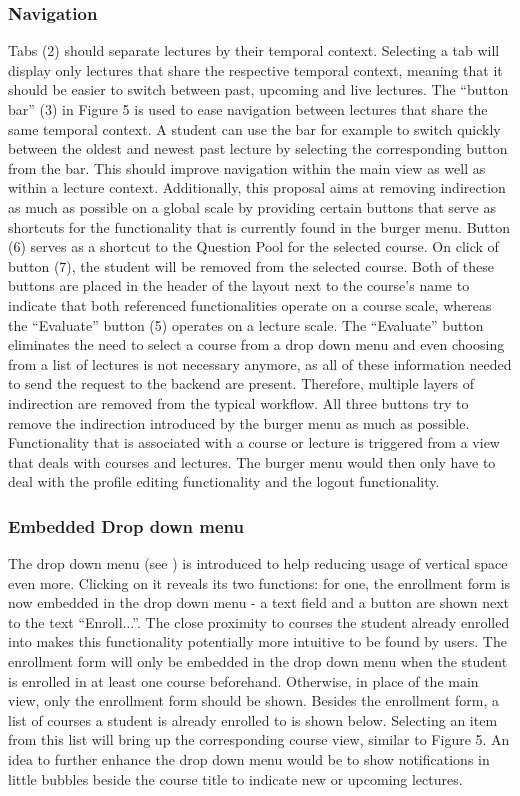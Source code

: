 \subsubsection{Navigation}
Tabs (2) should separate lectures by their temporal context. Selecting a tab will display only lectures that share the respective temporal context, meaning that it should be easier to switch between past, upcoming and live lectures.
The “button bar” (3) in Figure 5 is used to ease navigation between lectures that share the same temporal context. A student can use the bar for example to switch quickly between the oldest and newest past lecture by selecting the corresponding button from the bar. This should improve navigation within the main view as well as within a lecture context. 
Additionally, this proposal aims at removing indirection as much as possible on a global scale by providing certain buttons that serve as shortcuts for the functionality that is currently found in the burger menu. Button (6) serves as a shortcut to the Question Pool for the selected course. On click of button (7), the student will be removed from the selected course. Both of these buttons are placed in the header of the layout next to the course’s name to indicate that both referenced functionalities operate on a course scale, whereas the “Evaluate” button (5) operates on a lecture scale. The “Evaluate” button eliminates the need to select a course from a drop down menu and even choosing from a list of lectures is not necessary anymore, as all of these information needed to send the request to the backend are present. Therefore, multiple layers of indirection are removed from the typical workflow. All three buttons try to remove the indirection introduced by the burger menu as much as possible. Functionality that is associated with a course or lecture is triggered from a view that deals with courses and lectures. The burger menu would then only have to deal with the profile editing functionality and the logout functionality.

\subsubsection{Embedded Drop down menu}
The drop down menu (see \todogrf) is introduced to help reducing usage of vertical space even more. Clicking on it reveals its two functions: for one, the enrollment form is now embedded in the drop down menu - a text field and a button are shown next to the text “Enroll...”. The close proximity to courses the student already enrolled into makes this functionality potentially more intuitive to be found by users. The enrollment form will only be embedded in the drop down menu when the student is enrolled in at least one course beforehand. Otherwise, in place of the main view, only the enrollment form should be shown. Besides the enrollment form, a list of courses a student is already enrolled to is shown below. Selecting an item from this list will bring up the corresponding course view, similar to Figure 5.
 An idea to further enhance the drop down menu would be to show notifications in little bubbles beside the course title to indicate new or upcoming lectures.


